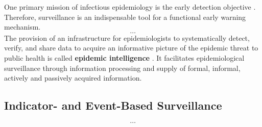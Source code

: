   One primary mission of infectious epidemiology is the early detection objective \citep{EarlyDetection}.
  Therefore, surveillance is an indispensable tool for a functional early warning mechanism.
  \[\dots\]
  The provision of an infrastructure for epidemiologists to systematically detect, verify, and share data to acquire an informative picture of the epidemic threat to public health is called \textbf{epidemic intelligence} \citep{EarlyDetection}.
  It facilitates epidemiological surveillance through information processing and supply of formal, informal, actively and passively acquired information.

\subsection{Indicator- and Event-Based Surveillance}
  \[\dots\]

